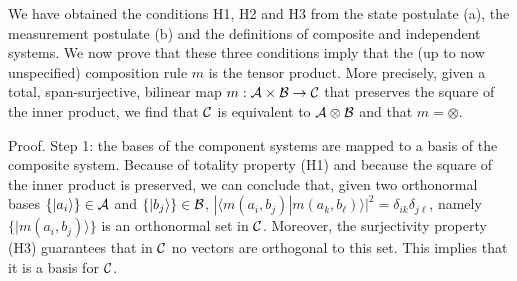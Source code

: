 \documentclass[aps,prl,amsmath,amssymb,twocolumn,nofootinbib]{revtex4}
\theoremstyle{plain}
\theoremstyle{definition}
\theoremstyle{remark}
\def\>{\rangle}
\def\<{\langle}
\begin{document}
We have obtained the conditions H1, H2 and H3 from the state postulate
(a), the measurement postulate (b) and the definitions of composite and independent
systems. We now prove that these three conditions imply that the (up
to now unspecified) composition rule $m$ is the tensor product. More
precisely, given a total, span-surjective, bilinear map $m:{\cal A}\times{\cal B}\to{\cal C}$ that preserves the square of the inner
product, we find that $\cal C $ is equivalent to
$\cal A \otimes \cal B $ and that $m=\otimes$.
  
Proof. Step 1: the bases of the component systems are mapped to a
basis of the composite system. Because of totality property (H1) and
because the square of the inner product is preserved, we can conclude
that, given two orthonormal bases $\{|a_i\>\}\in{\cal A}$ and
$\{|b_j\>\}\in{\cal B}$,
$|\<m(a_i,b_j)|m(a_k,b_\ell)\>|^2=\delta_{ik}\delta_{j\ell}$, namely
$\{|m(a_i,b_j)\>\}$ is an orthonormal set in $\cal C$.  Moreover, the
surjectivity property (H3) guarantees that in $\cal C$ no vectors are
orthogonal to this set. This implies that it is a basis for $\cal C$.
\end{document}
